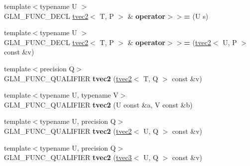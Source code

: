 \begin{DoxyCompactItemize}
\item 
{\footnotesize template$<$typename U $>$ }\\G\+L\+M\+\_\+\+F\+U\+N\+C\+\_\+\+D\+E\+CL \hyperlink{structglm_1_1detail_1_1tvec2}{tvec2}$<$ T, P $>$ \& {\bfseries operator$>$$>$=} (U s)\hypertarget{structglm_1_1detail_1_1tvec2_a7198fd5d5bacb28ad4e7709856126fa5}{}\label{structglm_1_1detail_1_1tvec2_a7198fd5d5bacb28ad4e7709856126fa5}

\item 
{\footnotesize template$<$typename U $>$ }\\G\+L\+M\+\_\+\+F\+U\+N\+C\+\_\+\+D\+E\+CL \hyperlink{structglm_1_1detail_1_1tvec2}{tvec2}$<$ T, P $>$ \& {\bfseries operator$>$$>$=} (\hyperlink{structglm_1_1detail_1_1tvec2}{tvec2}$<$ U, P $>$ const \&v)\hypertarget{structglm_1_1detail_1_1tvec2_aa5b4c36cf93fa89e33911f74c7352284}{}\label{structglm_1_1detail_1_1tvec2_aa5b4c36cf93fa89e33911f74c7352284}

\item 
{\footnotesize template$<$precision Q$>$ }\\G\+L\+M\+\_\+\+F\+U\+N\+C\+\_\+\+Q\+U\+A\+L\+I\+F\+I\+ER {\bfseries tvec2} (\hyperlink{structglm_1_1detail_1_1tvec2}{tvec2}$<$ T, Q $>$ const \&v)\hypertarget{structglm_1_1detail_1_1tvec2_a34375ce019c83789e03dc185c9025bee}{}\label{structglm_1_1detail_1_1tvec2_a34375ce019c83789e03dc185c9025bee}

\item 
{\footnotesize template$<$typename U, typename V$>$ }\\G\+L\+M\+\_\+\+F\+U\+N\+C\+\_\+\+Q\+U\+A\+L\+I\+F\+I\+ER {\bfseries tvec2} (U const \&a, V const \&b)\hypertarget{structglm_1_1detail_1_1tvec2_a1057576a2eab171002a8ff2bf4bd68ad}{}\label{structglm_1_1detail_1_1tvec2_a1057576a2eab171002a8ff2bf4bd68ad}

\item 
{\footnotesize template$<$typename U, precision Q$>$ }\\G\+L\+M\+\_\+\+F\+U\+N\+C\+\_\+\+Q\+U\+A\+L\+I\+F\+I\+ER {\bfseries tvec2} (\hyperlink{structglm_1_1detail_1_1tvec2}{tvec2}$<$ U, Q $>$ const \&v)\hypertarget{structglm_1_1detail_1_1tvec2_a8ea4daf34f1286102f8a0fc565b1376d}{}\label{structglm_1_1detail_1_1tvec2_a8ea4daf34f1286102f8a0fc565b1376d}

\item 
{\footnotesize template$<$typename U, precision Q$>$ }\\G\+L\+M\+\_\+\+F\+U\+N\+C\+\_\+\+Q\+U\+A\+L\+I\+F\+I\+ER {\bfseries tvec2} (\hyperlink{structglm_1_1detail_1_1tvec3}{tvec3}$<$ U, Q $>$ const \&v)\hypertarget{structglm_1_1detail_1_1tvec2_a9dd6ae59acae6434a5ca48e06b01953d}{}\label{structglm_1_1detail_1_1tvec2_a9dd6ae59acae6434a5ca48e06b01953d}


\end{DoxyCompactItemize}
